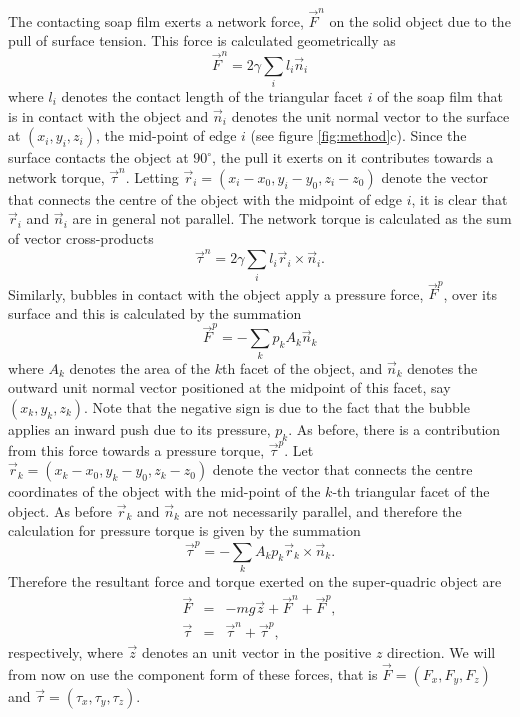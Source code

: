 \documentclass[preprint]{revtex4-1}
\begin{document}
The contacting soap film exerts a network force, $\vec{F}^n$ on the solid object due to the pull of surface tension. This force is calculated geometrically as
\begin{equation}
\vec{F}^n=2\gamma\sum_i l_i\vec{n}_i
\label{eq:networforce}
\end{equation}
where $l_i$ denotes the contact length of the triangular facet $i$ of the soap film that is in contact with the object and $\vec{n}_i$ denotes the unit normal vector to the surface at $\left(x_i,y_i,z_i\right)$, the mid-point of edge $i$ (see figure \ref{fig:method}c). Since the surface contacts the object at $90^\circ$, the pull it exerts on it contributes towards a network torque, $\vec{\tau}^n$. Letting $\vec{r}_i=\left(x_i-x_0,y_i-y_0,z_i-z_0\right)$ denote the vector that connects the centre of the object with the midpoint of edge $i$, it is clear that $\vec{r}_i$ and $\vec{n}_i$ are in general not parallel. The network torque is calculated as the sum of vector cross-products 
\begin{equation}
\vec{\tau}^n=2\gamma\sum_i l_i\vec{r}_i\times\vec{n}_i.
\label{eq:networktorque}
\end{equation}
Similarly, bubbles in contact with the object apply a pressure force, $\vec{F}^p$, over its surface and this is calculated by the summation 
\begin{equation}
\vec{F}^p=-\sum_k p_k A_k\vec{n}_k
\label{eq:pressureforce}
\end{equation}
where  $A_k$ denotes the area of the $k$th facet of the object, and $\vec{n}_k$ denotes the outward unit normal vector positioned at the midpoint of this facet, say $\left(x_k,y_k,z_k\right)$. Note that the negative sign is due to the fact that the bubble applies an inward push due to its pressure, $p_k$. As before, there is a contribution from this force towards a pressure torque, $\vec{\tau}^p$. Let $\vec{r}_k=\left(x_k-x_0,y_k-y_0,z_k-z_0\right)$ denote the vector that connects the centre coordinates of the object with the mid-point of the $k$-th triangular facet of the object. As before $\vec{r}_k$ and $\vec{n}_k$ are not necessarily parallel, and therefore the calculation for pressure torque is given by the summation
\begin{equation}
\vec{\tau}^p=-\sum_k A_kp_k\vec{r}_k\times\vec{n}_k.
\label{eq:pressuretorque}
\end{equation}
Therefore the resultant force and torque exerted on the super-quadric object are
\begin{eqnarray}
\vec{F}&=&-mg\vec{z}+\vec{F}^n+\vec{F}^p,\\
\vec{\tau}&=&\vec{\tau}^n+\vec{\tau}^p,
\end{eqnarray}
respectively, where $\vec{z}$ denotes an unit vector in the positive $z$ direction. We will from now on use the component form of these forces, that is $\vec{F}=\left(F_x,F_y,F_z\right)$ and $\vec{\tau}=\left(\tau_x,\tau_y,\tau_z\right)$.  
\end{document}
